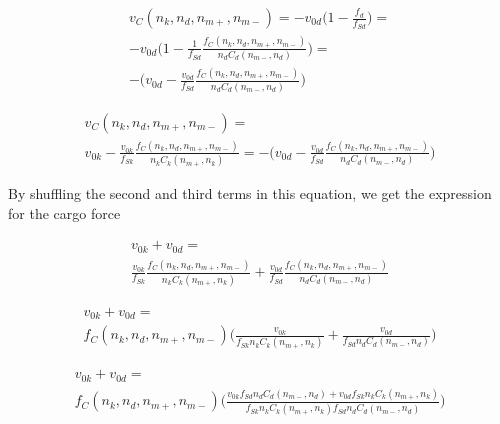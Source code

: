 \begin{equation}
\begin{split}
v_C(n_k, n_d, n_{m+}, n_{m-}) = -v_{0d}\big(1-\frac{f_d}{f_{Sd}}\big) =\\ -v_{0d}\big(1-\frac{1}{f_{Sd}}\frac{f_C(n_k, n_d, n_{m+}, n_{m-})}{n_dC_d(n_{m-},n_d)}\big) = \\
-\big(v_{0d}-\frac{v_{0d}}{f_{Sd}}\frac{f_C(n_k, n_d, n_{m+}, n_{m-})}{n_dC_d(n_{m-},n_d)}\big)
\end{split}
\end{equation}

\begin{equation}
\begin{split}
v_C(n_k, n_d, n_{m+}, n_{m-}) =\\ v_{0k}-\frac{v_{0k}}{f_{Sk}}\frac{f_C(n_k, n_d, n_{m+}, n_{m-})}{n_kC_k(n_{m+}, n_k)} =
-\big(v_{0d}-\frac{v_{0d}}{f_{Sd}}\frac{f_C(n_k, n_d, n_{m+}, n_{m-})}{n_dC_d(n_{m-},n_d)}\big)
\end{split}
\end{equation}

By shuffling the second and third terms in this equation, we get the expression for the cargo force

\begin{equation}
\begin{split}
v_{0k} + v_{0d}  = \\
\frac{v_{0k}}{f_{Sk}}\frac{f_C(n_k, n_d, n_{m+}, n_{m-})}{n_kC_k(n_{m+}, n_k)} + \frac{v_{0d}}{f_{Sd}}\frac{f_C(n_k, n_d, n_{m+}, n_{m-})}{n_dC_d(n_{m-},n_d)}
\end{split}
\end{equation}

\begin{equation}
\begin{split}
v_{0k} + v_{0d}  = \\
f_C(n_k, n_d, n_{m+}, n_{m-}) \big( \frac{v_{0k}}{f_{Sk}n_kC_k(n_{m+}, n_k)} + \frac{v_{0d}}{f_{Sd}n_dC_d(n_{m-},n_d)} \big)
\end{split}
\end{equation}

\begin{equation}
\begin{split}
v_{0k} + v_{0d}  = \\
f_C(n_k, n_d, n_{m+}, n_{m-}) \big( \frac{v_{0k}f_{Sd}n_dC_d(n_{m-},n_d) + v_{0d}f_{Sk}n_kC_k(n_{m+}, n_k)}{f_{Sk}n_kC_k(n_{m+}, n_k)f_{Sd}n_dC_d(n_{m-},n_d)} \big)
\end{split}
\end{equation}

